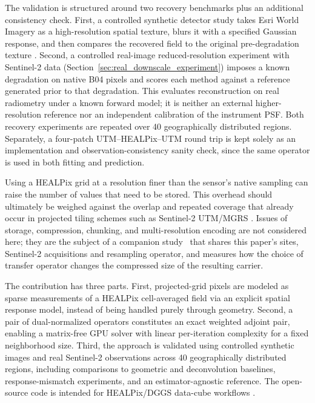 \documentclass[journal]{IEEEtran}
\newcommand{\healpix}{HEALPix\xspace}
\newcommand{\utm}{UTM\xspace}
\newcommand{\psf}{PSF\xspace}
\begin{document}
The validation is structured around two recovery benchmarks plus an additional consistency check. First, a controlled synthetic detector study takes Esri World Imagery as a high-resolution spatial texture, blurs it with a specified Gaussian response, and then compares the recovered field to the original pre-degradation texture \cite{esri_world_imagery}. Second, a controlled real-image reduced-resolution experiment with Sentinel-2 data (Section~\ref{sec:real_downscale_experiment}) imposes a known degradation on native B04 pixels and scores each method against a reference generated prior to that degradation. This evaluates reconstruction on real radiometry under a known forward model; it is neither an external higher-resolution reference nor an independent calibration of the instrument \psf. Both recovery experiments are repeated over 40 geographically distributed regions. Separately, a four-patch \utm--\healpix--\utm round trip is kept solely as an implementation and observation-consistency sanity check, since the same operator is used in both fitting and prediction.

Using a \healpix grid at a resolution finer than the sensor’s native sampling can raise the number of values that need to be stored. This overhead should ultimately be weighed against the overlap and repeated coverage that already occur in projected tiling schemes such as Sentinel-2 UTM/MGRS \cite{bauer2023wasting}. Issues of storage, compression, chunking, and multi-resolution encoding are not considered here; they are the subject of a companion study~\cite{delouis2026compress} that shares this paper's sites, Sentinel-2 acquisitions and resampling operator, and measures how the choice of transfer operator changes the compressed size of the resulting carrier.

The contribution has three parts. First, projected-grid pixels are modeled as sparse measurements of a \healpix cell-averaged field via an explicit spatial response model, instead of being handled purely through geometry. Second, a pair of dual-normalized operators constitutes an exact weighted adjoint pair, enabling a matrix-free GPU solver with linear per-iteration complexity for a fixed neighborhood size. Third, the approach is validated using controlled synthetic images and real Sentinel-2 observations across 40 geographically distributed regions, including comparisons to geometric and deconvolution baselines, response-mismatch experiments, and an estimator-agnostic reference. The open-source code is intended for \healpix/DGGS data-cube workflows \cite{healpix_resample_repo}.
\end{document}
